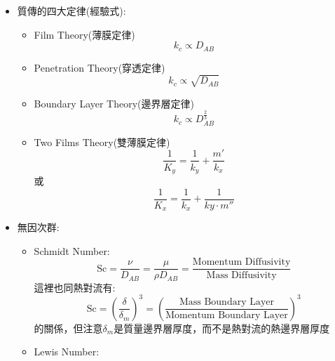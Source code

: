 \documentclass[../main.tex]{subfiles}
\begin{document}
\begin{itemize}
\begin{enumerate}
  當例如在孔洞中，$\lambda$遠大於系統的特徵長度$d$時，克努森擴散佔主導地位\\
  那碰撞就不在跟其他分子，而是跟孔洞壁面碰撞\\
  此時擴散行為可用Knudsen擴散方程式描述
  \begin{equation}
    D_{K} = \frac{2}{3} r_p \sqrt{\frac{8RT}{\pi M}}
  \end{equation}
  其中$r_p$是孔洞半徑
\end{enumerate}
\item 質傳的四大定律(經驗式):
\begin{itemize}
  \item Film Theory(薄膜定律)
    \begin{equation}
      k_c \propto D_{AB}
    \end{equation}
  \item Penetration Theory(穿透定律)
    \begin{equation}
      k_c \propto \sqrt{D_{AB}}
    \end{equation}
  \item Boundary Layer Theory(邊界層定律)
    \begin{equation}
      k_c \propto D_{AB}^{\frac{2}{3}}
    \end{equation}
  \item Two Films Theory(雙薄膜定律)
    \begin{equation}
      \frac{1}{K_y} = \frac{1}{k_{y}} + \frac{m'}{k_x}
    \end{equation}
    或
    \begin{equation}
      \frac{1}{K_x} = \frac{1}{k_x} + \frac{1}{ky\cdot m''}
    \end{equation}
\end{itemize}
\item 無因次群:
\begin{itemize}
  \item Schmidt Number:
  \begin{equation}
    \text{Sc} = \frac{\nu}{D_{AB}} = \frac{\mu}{\rho D_{AB}} = \frac{\text{Momentum Diffusivity}}{\text{Mass Diffusivity}}
  \end{equation}
  這裡也同熱對流有:
  \begin{equation}
    \text{Sc} = \left(\frac{\delta}{\delta_m}\right)^3 = \left(\frac{\text{Mass Boundary Layer}}{\text{Momentum Boundary Layer}}\right)^3
  \end{equation}
  的關係，但注意$\delta_m$是質量邊界層厚度，而不是熱對流的熱邊界層厚度
  \item Lewis Number:

\end{itemize}
\end{itemize}
\end{document}

